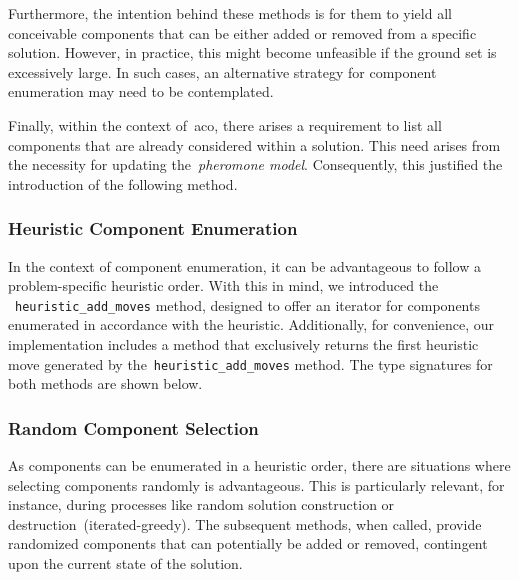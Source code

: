 Furthermore, the intention behind these methods is for them to yield all
conceivable components that can be either added or removed from a specific
solution.  However, in practice, this might become unfeasible if the ground set
is excessively large. In such cases, an alternative strategy for component
enumeration may need to be contemplated.

Finally, within the context of~\acrshort{aco}, there arises a requirement to
list all components that are already considered within a solution. This need
arises from the necessity for updating the~\textit{pheromone model}.
Consequently, this justified the introduction of the following method.

\begin{center}
\end{center}

\subsubsection*{Heuristic Component Enumeration}

In the context of component enumeration, it can be advantageous to follow a
problem-specific heuristic order. With this in mind, we introduced the
~\texttt{heuristic\_add\_moves} method, designed to offer an iterator for components
enumerated in accordance with the heuristic. Additionally, for convenience, our
implementation includes a method that exclusively returns the first heuristic
move generated by the~\texttt{heuristic\_add\_moves} method. The type signatures for
both methods are shown below.

\begin{center}

\end{center}

\subsubsection*{Random Component Selection}

As components can be enumerated in a heuristic order, there are situations where
selecting components randomly is advantageous. This is particularly relevant,
for instance, during processes like random solution construction or
destruction~(\acrshort{iterated-greedy}). The subsequent methods, when called,
provide randomized components that can potentially be added or removed,
contingent upon the current state of the solution.

